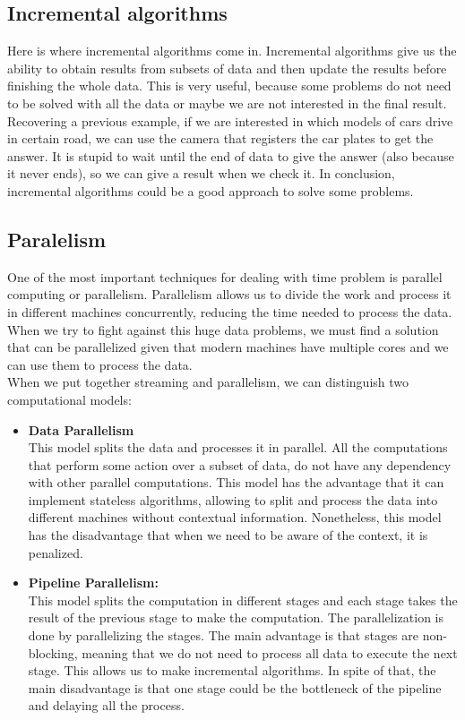 \subsection*{Incremental algorithms}
Here is where incremental algorithms come in.\cite{sharp_incremental_2007}
Incremental algorithms give us the ability to obtain results from subsets of data and then update the results before finishing the whole data.
This is very useful, because some problems do not need to be solved with all the data or maybe we are not interested in the final result.
Recovering a previous example, if we are interested in which models of cars drive in certain road, we can use the camera that registers the car plates to get the answer.
It is stupid to wait until the end of data to give the answer (also because it never ends), so we can give a result when we check it.
In conclusion, incremental algorithms could be a good approach to solve some problems.
\subsection*{Paralelism}
One of the most important techniques for dealing with time problem is parallel computing or parallelism.
Parallelism allows us to divide the work and process it in different machines concurrently, reducing the time needed to process the data.
When we try to fight against this huge data problems, we must find a solution that can be parallelized given that modern machines have multiple cores and we can use them to process the data.\\
When we put together streaming and parallelism, we can distinguish two computational models:
\begin{itemize}
    \item \textbf{Data Parallelism} \\ 
        This model splits the data and processes it in parallel.
        All the computations that perform some action over a subset of data, do not have any dependency with other parallel computations.
        This model has the advantage that it can implement stateless algorithms, allowing to split and process the data into different machines without contextual information.
        Nonetheless, this model has the disadvantage that when we need to be aware of the context, it is penalized.
    \item \textbf{Pipeline Parallelism:} \\
        This model splits the computation in different stages and each stage takes the result of the previous stage to make the computation.
        The parallelization is done by parallelizing the stages.
        The main advantage is that stages are non-blocking, meaning that we do not need to process all data to execute the next stage.
        This allows us to make incremental algorithms.
        In spite of that, the main disadvantage is that one stage could be the bottleneck of the pipeline and delaying all the process.
    \end{itemize}
